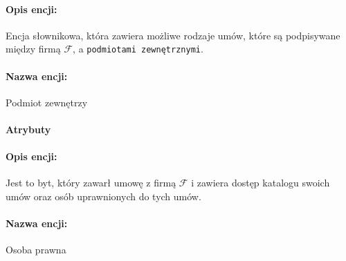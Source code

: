 \documentclass{article}
\begin{document}
\paragraph{Opis encji: \\}
Encja słownikowa, która zawiera możliwe rodzaje umów, które są podpisywane między firmą $\mathcal{F}$, a \texttt{podmiotami zewnętrznymi}.
\paragraph{Nazwa encji:\\ }
Podmiot zewnętrzy
\paragraph{Atrybuty\\}
\begin{table}[H]

\caption{Tabela z opisem encji.} 
\end{table}
\paragraph{Opis encji: \\}
Jest to byt, który zawarł umowę z firmą $\mathcal{F}$ i zawiera dostęp katalogu swoich umów oraz osób uprawnionych do tych umów. 
\paragraph{Nazwa encji:\\ }
Osoba prawna
\end{document}
